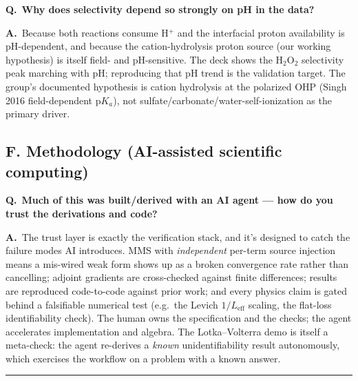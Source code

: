 \documentclass[11pt]{article}
\newcommand{\Leff}{L_{\mathrm{eff}}}
\newcommand{\Q}[1]{\medskip\par\noindent\textcolor{qcol}{\textbf{Q.}}\ \textbf{#1}\par\nopagebreak\smallskip}
\newcommand{\A}{\noindent\textbf{A.}\ \ignorespaces}
\begin{document}
\Q{Why does selectivity depend so strongly on pH in the data?}
\A Because both reactions consume H$^+$ and the interfacial proton
availability is pH-dependent, and because the cation-hydrolysis proton
source (our working hypothesis) is itself field- and pH-sensitive. The deck
shows the H$_2$O$_2$ selectivity peak marching with pH; reproducing that pH
trend is the validation target. The group's documented hypothesis is cation
hydrolysis at the polarized OHP (Singh 2016 field-dependent p$K_a$), not
sulfate/carbonate/water-self-ionization as the primary driver.

\subsection*{F. Methodology (AI-assisted scientific computing)}

\Q{Much of this was built/derived with an AI agent --- how do you trust the
derivations and code?}
\A The trust layer is exactly the verification stack, and it's designed to
catch the failure modes AI introduces. MMS with \emph{independent} per-term
source injection means a mis-wired weak form shows up as a broken convergence
rate rather than cancelling; adjoint gradients are cross-checked against
finite differences; results are reproduced code-to-code against prior work;
and every physics claim is gated behind a falsifiable numerical test (e.g.\
the Levich $1/\Leff$ scaling, the flat-loss identifiability check). The human
owns the specification and the checks; the agent accelerates implementation
and algebra. The Lotka--Volterra demo is itself a meta-check: the agent
re-derives a \emph{known} unidentifiability result autonomously, which
exercises the workflow on a problem with a known answer.

\medskip\hrule
\end{document}
